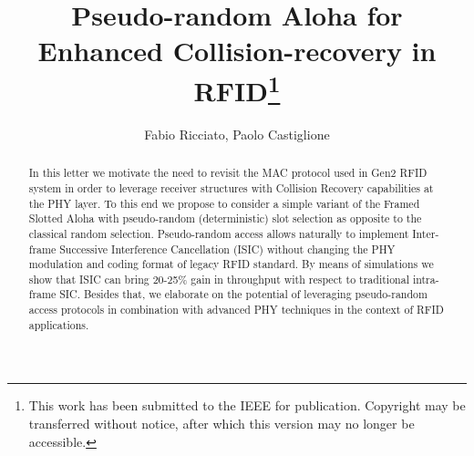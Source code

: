\documentclass[12pt,draftcls,onecolumn]{IEEEtran}
\begin{document}
\title{Pseudo-random Aloha for Enhanced Collision-recovery in RFID\footnote{This work has been submitted to the IEEE for publication. Copyright may be transferred without notice, after which this
version may no longer be accessible.}}

\author{Fabio Ricciato, Paolo Castiglione }

\maketitle              


\begin{abstract}
In this letter we motivate the need to revisit the MAC protocol used in Gen2 RFID system in order to leverage receiver structures with Collision Recovery capabilities at the PHY layer. To this end we propose to consider a simple variant of the Framed Slotted Aloha with pseudo-random (deterministic) slot selection as opposite to the classical random selection. Pseudo-random access allows naturally to implement Inter-frame Successive Interference Cancellation (ISIC) without changing the PHY modulation and coding format of legacy RFID standard.
By means of simulations we show that ISIC can bring 20-25\% gain in throughput with respect to traditional intra-frame SIC.
Besides that, we elaborate on the potential of leveraging pseudo-random access protocols in combination with advanced PHY techniques in the context of RFID applications.
\end{abstract}
\end{document}
